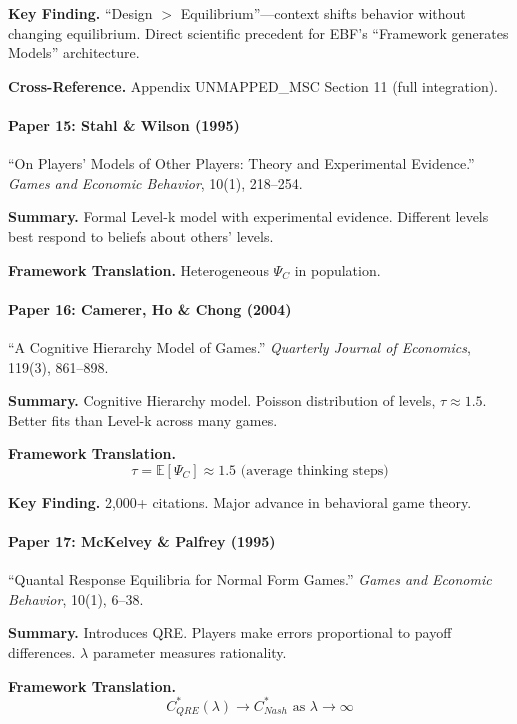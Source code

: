 \textbf{Key Finding.}
``Design $>$ Equilibrium''---context shifts behavior without changing equilibrium.
Direct scientific precedent for EBF's ``Framework generates Models'' architecture.

\textbf{Cross-Reference.} Appendix UNMAPPED_MSC Section 11 (full integration).

\paragraph{Paper 15: Stahl \& Wilson (1995)}

``On Players' Models of Other Players: Theory and Experimental Evidence.''
\textit{Games and Economic Behavior}, 10(1), 218--254.

\textbf{Summary.}
Formal Level-k model with experimental evidence. Different levels best 
respond to beliefs about others' levels.

\textbf{Framework Translation.}
Heterogeneous $\Psi_C$ in population.

\paragraph{Paper 16: Camerer, Ho \& Chong (2004)}

``A Cognitive Hierarchy Model of Games.''
\textit{Quarterly Journal of Economics}, 119(3), 861--898.

\textbf{Summary.}
Cognitive Hierarchy model. Poisson distribution of levels, $\tau \approx 1.5$.
Better fits than Level-k across many games.

\textbf{Framework Translation.}
\begin{equation}
\tau = \mathbb{E}[\Psi_C] \approx 1.5 \text{ (average thinking steps)}
\end{equation}

\textbf{Key Finding.}
2,000+ citations. Major advance in behavioral game theory.

\paragraph{Paper 17: McKelvey \& Palfrey (1995)}

``Quantal Response Equilibria for Normal Form Games.''
\textit{Games and Economic Behavior}, 10(1), 6--38.

\textbf{Summary.}
Introduces QRE. Players make errors proportional to payoff differences.
$\lambda$ parameter measures rationality.

\textbf{Framework Translation.}
\begin{equation}
C^*_{QRE}(\lambda) \to C^*_{Nash} \text{ as } \lambda \to \infty
\end{equation}

